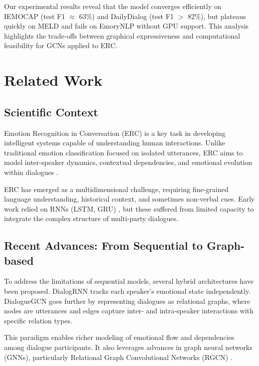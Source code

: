 \documentclass[a4paper,11pt]{article}
\begin{document}
Our experimental results reveal that the model converges efficiently on IEMOCAP (test F1 $\approx$ 63\%) and DailyDialog (test F1 $>$ 82\%), but plateaus quickly on MELD and fails on EmoryNLP without GPU support. This analysis highlights the trade-offs between graphical expressiveness and computational feasibility for GCNs applied to ERC.

\newpage

\section{Related Work}

\subsection{Scientific Context}
Emotion Recognition in Conversation (ERC) is a key task in developing intelligent systems capable of understanding human interactions. Unlike traditional emotion classification focused on isolated utterances, ERC aims to model inter-speaker dynamics, contextual dependencies, and emotional evolution within dialogues \cite{poria2019emotion,majumder2019dialoguernn}.

ERC has emerged as a multidimensional challenge, requiring fine-grained language understanding, historical context, and sometimes non-verbal cues. Early work relied on RNNs (LSTM, GRU) \cite{poria2017context}, but these suffered from limited capacity to integrate the complex structure of multi-party dialogues.

\subsection{Recent Advances: From Sequential to Graph-based}
To address the limitations of sequential models, several hybrid architectures have been proposed. DialogRNN \cite{majumder2019dialoguernn} tracks each speaker’s emotional state independently. DialogueGCN \cite{ghosal2019dialoguegcn} goes further by representing dialogues as relational graphs, where nodes are utterances and edges capture inter- and intra-speaker interactions with specific relation types.

This paradigm enables richer modeling of emotional flow and dependencies among dialogue participants. It also leverages advances in graph neural networks (GNNs), particularly Relational Graph Convolutional Networks (RGCN) \cite{schlichtkrull2018modeling}.
\end{document}
